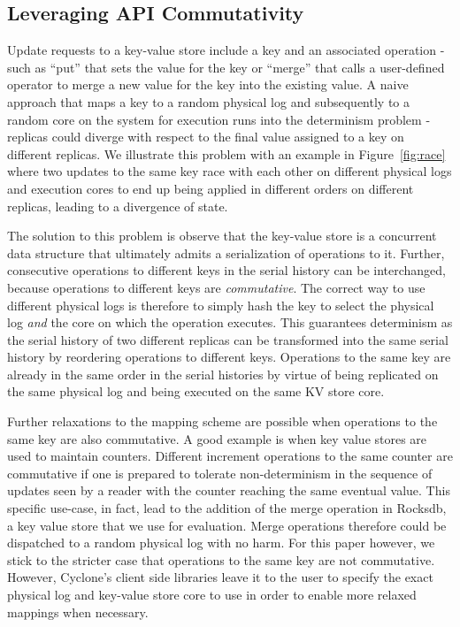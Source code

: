 \documentclass[pageno]{jpaper}
\begin{document}
\subsection{Leveraging API Commutativity}
Update requests to a key-value store include a key and an associated operation -
such as ``put'' that sets the value for the key or ``merge'' that calls a
user-defined operator to merge a new value for the key into the existing value.
A naive approach that maps a key to a random physical log and subsequently to a
random core on the system for execution runs into the determinism problem -
replicas could diverge with respect to the final value assigned to a key on
different replicas. We illustrate this problem with an example in
Figure~\ref{fig:race} where two updates to the same key race with each other on
different physical logs and execution cores to end up being applied in different
orders on different replicas, leading to a divergence of state.

The solution to this problem is observe that the key-value store is a concurrent
data structure that ultimately admits a serialization of operations to
it. Further, consecutive operations to different keys in the serial history can
be interchanged, because operations to different keys are
\emph{commutative}. The correct way to use different physical logs is therefore
to simply hash the key to select the physical log \emph{and} the core on which
the operation executes. This guarantees determinism as the serial history of
two different replicas can be transformed into the same serial history by
reordering operations to different keys. Operations to the same key are already
in the same order in the serial histories by virtue of being replicated on the
same physical log and being executed on the same KV store core.

Further relaxations to the mapping scheme are possible when operations to the
same key are also commutative. A good example is when key value stores are used
to maintain counters. Different increment operations to the same counter are
commutative if one is prepared to tolerate non-determinism in the sequence of
updates seen by a reader with the counter reaching the same eventual value. This
specific use-case, in fact, lead to the addition of the merge operation in
Rocksdb, a key value store that we use for evaluation. Merge operations
therefore could be dispatched to a random physical log with no harm. For this
paper however, we stick to the stricter case that operations to the same
key are not commutative. However, Cyclone's client side libraries leave it to
the user to specify the exact physical log and key-value store core to use in
order to enable more relaxed mappings when necessary.
\end{document}
